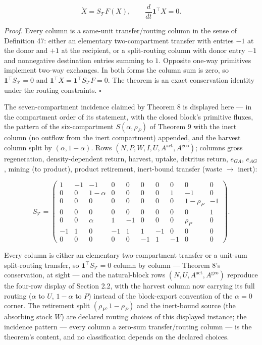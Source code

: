 \documentclass[11pt]{article}
\begin{document}
$$\dot X = S_{\mathcal{T}} F(X), \qquad \frac{d}{dt}\mathbf{1}^\top X = 0.$$



\emph{Proof.} Every column is a same-unit transfer/routing column in the sense of Definition 47: either an elementary two-compartment transfer with entries \(-1\) at the donor and \(+1\) at the recipient, or a split-routing column with donor entry \(-1\) and nonnegative destination entries summing to \(1\). Opposite one-way primitives implement two-way exchanges. In both forms the column sum is zero, so \(\mathbf{1}^\top S_{\mathcal{T}} = 0\) and \(\mathbf{1}^\top \dot X = \mathbf{1}^\top S_{\mathcal{T}} F = 0\). The theorem is an exact conservation identity under the routing constraints. \(\square\)

The seven-compartment incidence claimed by Theorem 8 is displayed here --- in the compartment order of its statement, with the closed block's primitive fluxes, the pattern of the six-compartment \(S(\alpha,\rho_P)\) of Theorem 9 with the inert column (no outflow from the inert compartment) appended, and the harvest column split by \((\alpha,1-\alpha)\). Rows \((N,\allowbreak{} P,\allowbreak{} W,\allowbreak{} I,\allowbreak{} U,\allowbreak{} A^{\mathrm{act}},\allowbreak{} A^{\mathrm{geo}})\); columns gross regeneration, density-dependent return, harvest, uptake, detritus return, \(e_{GA}\), \(e_{AG}\), mining (to product), product retirement, inert-bound transfer (waste \(\to\) inert): 

$$S_{\mathcal{T}} = \begin{pmatrix} 1 & -1 & -1 & 0 & 0 & 0 & 0 & 0 & 0 & 0 \\ 0 & 0 & 1-\alpha & 0 & 0 & 0 & 0 & 1 & -1 & 0 \\ 0 & 0 & 0 & 0 & 0 & 0 & 0 & 0 & 1-\rho_P & -1 \\ 0 & 0 & 0 & 0 & 0 & 0 & 0 & 0 & 0 & 1 \\ 0 & 0 & \alpha & 1 & -1 & 0 & 0 & 0 & \rho_P & 0 \\ -1 & 1 & 0 & -1 & 1 & 1 & -1 & 0 & 0 & 0 \\ 0 & 0 & 0 & 0 & 0 & -1 & 1 & -1 & 0 & 0 \end{pmatrix}.$$

 Every column is either an elementary two-compartment transfer or a unit-sum split-routing transfer, so \(\mathbf{1}^\top S_{\mathcal{T}} = 0\) column by column --- Theorem 8's conservation, at sight --- and the natural-block rows \((N, U, A^{\mathrm{act}}, A^{\mathrm{geo}})\) reproduce the four-row display of Section 2.2, with the harvest column now carrying its full routing (\(\alpha\) to \(U\), \(1-\alpha\) to \(P\)) instead of the block-export convention of the \(\alpha = 0\) corner. The retirement split \((\rho_P, 1-\rho_P)\) and the inert-bound source (the absorbing stock \(W\)) are declared routing choices of this displayed instance; the incidence pattern --- every column a zero-sum transfer/routing column --- is the theorem's content, and no classification depends on the declared choices.
\end{document}
